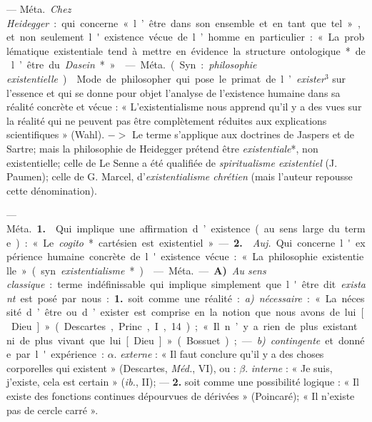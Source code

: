 \begin{itemize}[leftmargin=1cm, label=, itemsep=1pt]
 — \si{Méta.} {\it Chez Heidegger} :
qui concerne « l’être dans son ensemble et en tant que tel », et non
seulement l'existence vécue de
l’homme en particulier : « La problématique existentiale tend à mettre
en évidence la structure ontologique* de l’être du {\it Dasein}* ».

 — \si{Méta.} (Syn. : {\it philosophie existentielle}).
 Mode de philosopher qui pose le primat de
l’{\it exister}$^3$ sur l'essence et qui se
donne pour objet l’analyse de l’existence humaine dans sa réalité
concrète et vécue : « L’existentialisme
nous apprend qu'il y a des vues sur
la réalité qui ne peuvent pas être
complètement réduites aux explications scientifiques » (Wahl). $->$
Le terme s'applique aux doctrines
de Jaspers et de Sartre; mais la
philosophie de Heidegger prétend
être {\it existentiale}*, non existentielle;
celle de Le Senne a été qualifiée de
{\it spiritualisme existentiel} (J. Paumen);
celle de G. Marcel, d’{\it existentialisme
chrétien} (mais l’auteur repousse
cette dénomination).

 — \si{Méta.} {\bf 1.}  Qui implique
une affirmation d’existence (au sens
large du terme) : « Le {\it cogito}* cartésien est existentiel ».
— {\bf 2.}  {\it Auj.}
Qui concerne l'expérience humaine
concrète de l'existence vécue : « La
philosophie existentielle » (syn.
{\it existentialisme}*).

 — \si{Méta.} — {\bf A)} {\it Au sens classique} :
terme indéfinissable qui implique simplement que l'être dit
{\it existant} est posé par nous : {\bf 1.} soit
comme une réalité : {\it a)} {\it nécessaire} :
« La nécessité d’être ou d’exister est
comprise en la notion que nous
avons de lui [Dieu] » (Descartes,
Princ., I, 14) ; « Il n’y a rien de plus
existant ni de plus vivant que lui
[Dieu] » (Bossuet); — {\it b)} {\it contingente}
et donnée par l'expérience : $\alpha$. {\it externe} : « Il faut conclure
qu'il y a des choses corporelles qui existent » (Descartes, {\it Méd.},
VI), ou : $\beta$. {\it interne} : « Je suis, j'existe, cela est
certain » ({\it ib.}, II); — {\bf 2.} soit comme
une possibilité logique : « Il existe
des fonctions continues dépourvues
de dérivées » (Poincaré); « Il n'existe
pas de cercle carré ».


\end{itemize}
